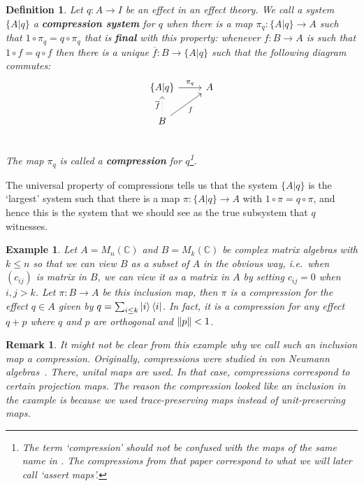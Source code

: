 \documentclass[a4paper,onecolumn,10pt,accepted=2019-05-03, issue=1, volume=1, shorttitle=papers/compositionality-1-1]{compositionalityarticle}
\newcounter{counter}
\numberwithin{counter}{section}
\newtheorem{definition}[counter]{Definition}
\newtheorem{remark}[counter]{Remark}
\newtheorem{example}[counter]{Example}
\newcommand{\C}{\mathbb{C}}
\newcommand{\cl}[1]{\overline{#1}}
\begin{document}
\begin{definition}\label{def:compression}
    Let $q: A\rightarrow I$ be an effect in an effect theory. We call a system $\{A\lvert q\}$ a \textbf{compression system} for $q$ when there is a map $\pi_q:\{A\lvert q\}\rightarrow A$ such that $1\circ \pi_q = q\circ \pi_q$ that is \textbf{final} with this property: whenever $f:B\rightarrow A$ is such that $1\circ f = q\circ f$ then there is a unique $\cl{f}:B\rightarrow \{A\lvert q\}$ such that the following diagram commutes:
    \[\begin{tikzcd}[ampersand replacement = \&]
    \{A\lvert q\} \arrow{r}{\pi_q}\& A \\
    B \arrow[dotted]{u}{\overline{f}}\arrow{ru}[swap]{f}\&  \\
    \end{tikzcd}\] 
    The map $\pi_q$ is called a \textbf{compression} for $q$\footnote{The term `compression' should not be confused with the maps of the same name in \cite{alfsen2012geometry}. The compressions from that paper correspond to what we will later call `assert maps'.}.
\end{definition}

The universal property of compressions tells us that the system $\{A\lvert q\}$ is the `largest' system such that there is a map $\pi:\{A\lvert q\}\rightarrow A$ with $1\circ\pi = q\circ \pi$, and hence this is the system that we should see as the true subsystem that $q$ witnesses.

\begin{example}
    Let $A=M_n(\C)$ and $B=M_k(\C)$ be complex matrix algebras with $k\leq n$ so that we can view $B$ as a subset of $A$ in the obvious way, i.e.\ when $(c_{ij})$ is matrix in $B$, we can view it as a matrix in $A$ by setting $c_{ij}=0$ when $i,j> k$. Let $\pi:B\rightarrow A$ be this inclusion map, then $\pi$ is a compression for the effect $q\in A$ given by $q=\sum_{i\leq k}\ket{i}\bra{i}$. In fact, it is a compression for any effect $q+p$ where $q$ and $p$ are orthogonal and $\norm{p} < 1$.
\end{example}

\begin{remark}
    It might not be clear from this example why we call such an inclusion map a compression. Originally, compressions were studied in von Neumann algebras~\cite{westerbaan2016universal}. There, unital maps are used. In that case, compressions correspond to certain projection maps. The reason the compression looked like an inclusion in the example is because we used trace-preserving maps instead of unit-preserving maps.
\end{remark}
\end{document}
